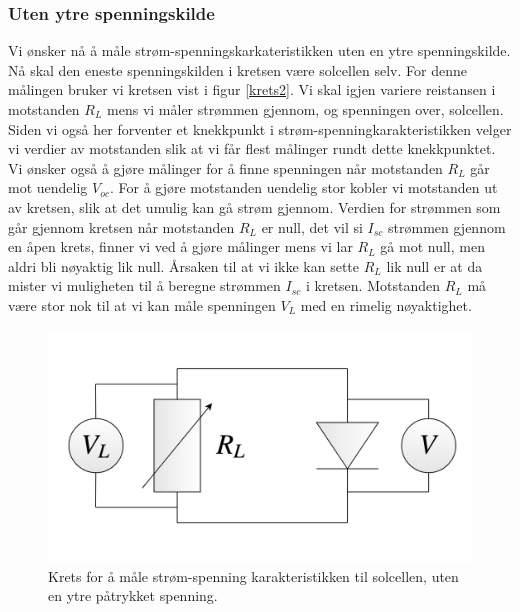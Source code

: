 \documentclass[%
 reprint,
 amsmath,amssymb,
 aps,
 norsk,
 booktabs
]{revtex4-1}
\begin{document}
\subsubsection{Uten ytre spenningskilde}
Vi ønsker nå å måle strøm-spenningskarkateristikken uten en ytre spenningskilde. Nå skal den eneste spenningskilden i kretsen være solcellen selv. For denne målingen bruker vi kretsen vist i figur \vref{krets2}. Vi skal igjen variere reistansen i motstanden $R_L$ mens vi måler strømmen gjennom, og spenningen over, solcellen. Siden vi også her forventer et knekkpunkt i strøm-spenningkarakteristikken velger vi verdier av motstanden slik at vi får flest målinger rundt dette knekkpunktet. Vi ønsker også å gjøre målinger for å finne spenningen når motstanden $R_L$ går mot uendelig $V_{oc}$. For å gjøre motstanden uendelig stor kobler vi motstanden ut av kretsen, slik at det umulig kan gå strøm gjennom. Verdien for strømmen som går gjennom kretsen når motstanden $R_L$ er null, det vil si $I_{sc}$ strømmen gjennom en åpen krets, finner vi ved å gjøre målinger mens vi lar $R_L$ gå mot null, men aldri bli nøyaktig lik null. Årsaken til at vi ikke kan sette $R_L$ lik null er at da mister vi muligheten til å beregne strømmen $I_{sc}$ i kretsen. Motstanden $R_L$ må være stor nok til at vi kan måle spenningen $V_L$ med en rimelig nøyaktighet.
\begin{figure}[h!]
  \centering
  \includegraphics[scale=0.15]{krets2.png}
  \caption{Krets for å måle strøm-spenning karakteristikken til solcellen, uten en ytre påtrykket spenning.}
  \label{krets2}
\end{figure}
\end{document}
